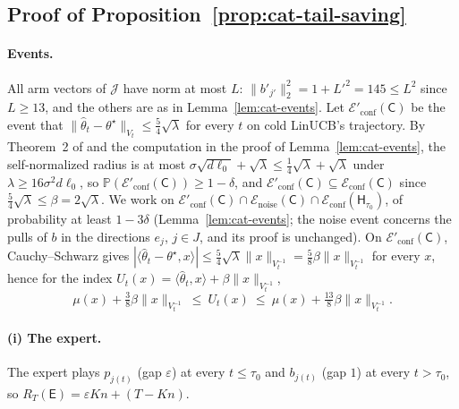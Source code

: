 \documentclass[anon]{alt2027} %
\newcommand{\Prb}{\mathbb{P}}
\newcommand{\eps}{\varepsilon}
\newcommand{\Cold}{\mathsf{C}}
\newcommand{\Exp}{\mathsf{E}}
\newcommand{\Hyb}{\mathsf{H}}
\begin{document}
\subsection{Proof of Proposition~\ref{prop:cat-tail-saving}}
\label{app:proof-tail-saving}

\paragraph{Events.}
All arm vectors of $\mathcal J$ have norm at most $L$: $\|b'_{j'}\|_2^2=1+L'^2=145\le L^2$
since $L\ge13$, and the others are as in Lemma~\ref{lem:cat-events}. Let
$\mathcal E'_{\mathrm{conf}}(\Cold)$ be the event that
$\|\widehat\theta_t-\theta^\star\|_{V_t}\le\tfrac54\sqrt\lambda$ for every $t$
on cold LinUCB's trajectory. By Theorem~2 of \citet{abbasi2011improved} and
the computation in the proof of Lemma~\ref{lem:cat-events}, the
self-normalized radius is at most $\sigma\sqrt{d\ell_0}+\sqrt\lambda\le\tfrac14\sqrt\lambda+\sqrt\lambda$
under $\lambda\ge16\sigma^2d\ell_0$, so
$\Prb(\mathcal E'_{\mathrm{conf}}(\Cold))\ge1-\delta$, and
$\mathcal E'_{\mathrm{conf}}(\Cold)\subseteq\mathcal E_{\mathrm{conf}}(\Cold)$
since $\tfrac54\sqrt\lambda\le\beta=2\sqrt\lambda$. We work on
$\mathcal E'_{\mathrm{conf}}(\Cold)\cap\mathcal E_{\mathrm{noise}}(\Cold)\cap\mathcal E_{\mathrm{conf}}(\Hyb_{\tau_0})$,
of probability at least $1-3\delta$ (Lemma~\ref{lem:cat-events}; the noise
event concerns the pulls of $b$ in the directions $e_j$, $j\in J$, and its
proof is unchanged). On $\mathcal E'_{\mathrm{conf}}(\Cold)$, Cauchy--Schwarz
gives $|\langle\widehat\theta_t-\theta^\star,x\rangle|\le\tfrac54\sqrt\lambda\|x\|_{V_t^{-1}}=\tfrac58\beta\|x\|_{V_t^{-1}}$
for every $x$, hence for the index $U_t(x)=\langle\widehat\theta_t,x\rangle+\beta\|x\|_{V_t^{-1}}$,
\begin{equation}
\label{eq:sharp-index}
\mu(x)+\tfrac38\beta\|x\|_{V_t^{-1}}\ \le\ U_t(x)\ \le\ \mu(x)+\tfrac{13}8\beta\|x\|_{V_t^{-1}} .
\end{equation}

\paragraph{(i) The expert.}
The expert plays $p_{j(t)}$ (gap $\eps$) at every $t\le\tau_0$ and $b_{j(t)}$
(gap $1$) at every $t>\tau_0$, so $R_T(\Exp)=\eps Kn+(T-Kn)$.
\end{document}
